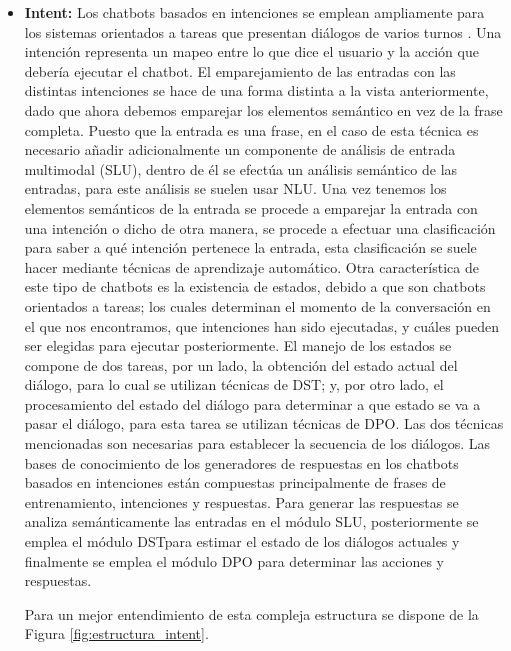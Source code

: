 \begin{itemize}
\item \textbf{Intent:} Los chatbots basados en intenciones se emplean ampliamente para los sistemas orientados a tareas que presentan diálogos de varios turnos \cite{RefWorks:RefID:36-luo2022critical}. Una intención representa un mapeo entre lo que dice el usuario y la acción que debería ejecutar el chatbot. El emparejamiento de las entradas con las distintas intenciones se hace de una forma distinta a la vista anteriormente, dado que ahora debemos emparejar los elementos semántico en vez de la frase completa. Puesto que la entrada es una frase, en el caso de esta técnica es necesario añadir adicionalmente un componente de análisis de entrada multimodal (SLU), dentro de él se efectúa un análisis semántico de las entradas, para este análisis se suelen usar \gls{NLU}. Una vez tenemos los elementos semánticos de la entrada se procede a emparejar la entrada con una intención o dicho de otra manera, se procede a efectuar una clasificación para saber a qué intención pertenece la entrada, esta clasificación se suele hacer mediante técnicas de aprendizaje automático. Otra característica de este tipo de chatbots es la existencia de estados, debido a que son chatbots orientados a tareas; los cuales determinan el momento de la conversación en el que nos encontramos, que intenciones han sido ejecutadas, y cuáles pueden ser elegidas para ejecutar posteriormente. El manejo de los estados se compone de dos tareas, por un lado, la obtención del estado actual del diálogo, para lo cual se utilizan técnicas de \gls{DST}; y, por otro lado, el procesamiento del estado del diálogo para determinar a que estado se va a pasar el diálogo, para esta tarea se utilizan técnicas de \gls{DPO}. Las dos técnicas mencionadas son necesarias para establecer la secuencia de los diálogos. Las bases de conocimiento de los generadores de respuestas en los chatbots basados en intenciones están compuestas principalmente de frases de entrenamiento, intenciones y respuestas. Para generar las respuestas se analiza semánticamente las entradas en el módulo SLU, posteriormente se emplea el módulo \gls{DST}para estimar el estado de los diálogos actuales y finalmente se emplea el módulo \gls{DPO} para determinar las acciones y respuestas.

Para un mejor entendimiento de esta compleja estructura se dispone de la Figura \ref{fig:estructura_intent}.


\end{itemize}
